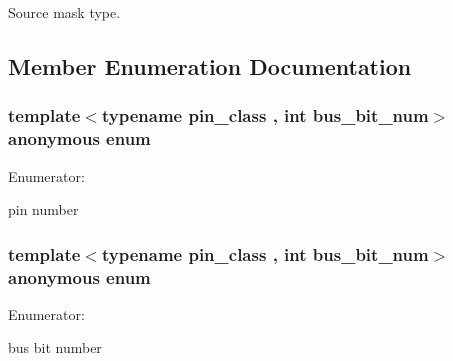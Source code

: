 Source mask type. 



\subsection{Member Enumeration Documentation}
\hypertarget{structavrpp_1_1bus_1_1bus__pin_a0b738638d43a072d7f61857bfdd96c5b}{
\subsubsection[{"@1}]{\setlength{\rightskip}{0pt plus 5cm}template$<$typename pin\_\-class , int bus\_\-bit\_\-num$>$ anonymous enum}}
\label{structavrpp_1_1bus_1_1bus__pin_a0b738638d43a072d7f61857bfdd96c5b}
\begin{Desc}
\item[Enumerator: ]\par
\begin{description}
\item[{\em 
\hypertarget{structavrpp_1_1bus_1_1bus__pin_a0b738638d43a072d7f61857bfdd96c5ba56893600916502906dd7233f651ebc55}{
port\_\-pin}
\label{structavrpp_1_1bus_1_1bus__pin_a0b738638d43a072d7f61857bfdd96c5ba56893600916502906dd7233f651ebc55}
}]pin number \end{description}
\end{Desc}

\hypertarget{structavrpp_1_1bus_1_1bus__pin_a7573a6e820f736de9b278a8b0005cdb9}{
\subsubsection[{"@2}]{\setlength{\rightskip}{0pt plus 5cm}template$<$typename pin\_\-class , int bus\_\-bit\_\-num$>$ anonymous enum}}
\label{structavrpp_1_1bus_1_1bus__pin_a7573a6e820f736de9b278a8b0005cdb9}
\begin{Desc}
\item[Enumerator: ]\par
\begin{description}
\item[{\em 
\hypertarget{structavrpp_1_1bus_1_1bus__pin_a7573a6e820f736de9b278a8b0005cdb9aacd5a8a6d66675a0ac2fc9f2860e54af}{
bus\_\-bit}
\label{structavrpp_1_1bus_1_1bus__pin_a7573a6e820f736de9b278a8b0005cdb9aacd5a8a6d66675a0ac2fc9f2860e54af}
}]bus bit number \end{description}
\end{Desc}

